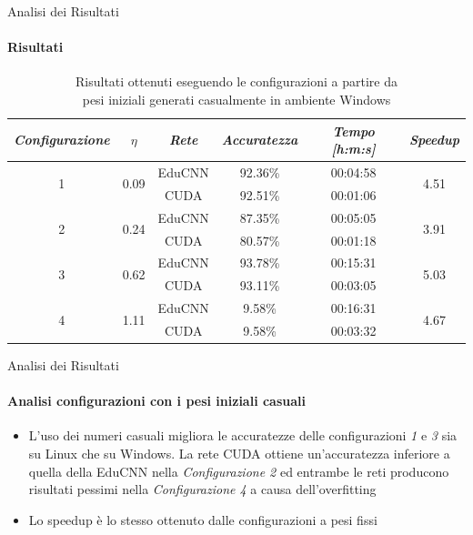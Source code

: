 \documentclass[
 ]{beamer}
\begin{document}
\begin{frame}{Analisi dei Risultati}
    \framesubtitle{Risultati}

           \begin{table}
            \centering
            \renewcommand\arraystretch{1.3}
            \small
            \begin{tabular}{| c | c | c | c | c | c |}
                \hline
                \emph{Configurazione} & $\eta$ & \emph{Rete} & \emph{Accuratezza} & \emph{Tempo [h:m:s]} & \emph{Speedup} \\
                \hline
                \multirow{2}{*}{1} & \multirow{2}{*}{0.09} & EduCNN & 92.36\% & 00:04:58 & \multirow{2}{*}{4.51} \\ \cline{3-5} 
                                   &                       & CUDA   & 92.51\% & 00:01:06 & \\
                \hline
                \multirow{2}{*}{2} & \multirow{2}{*}{0.24} & EduCNN & 87.35\% & 00:05:05 & \multirow{2}{*}{3.91} \\ \cline{3-5} 
                                   &                       & CUDA   & 80.57\% & 00:01:18  & \\
                \hline
                \multirow{2}{*}{3} & \multirow{2}{*}{0.62} & EduCNN & 93.78\% & 00:15:31 & \multirow{2}{*}{5.03} \\ \cline{3-5} 
                                   &                       & CUDA   & 93.11\% & 00:03:05 & \\
                \hline
                \multirow{2}{*}{4} & \multirow{2}{*}{1.11} & EduCNN & 9.58\% & 00:16:31 & \multirow{2}{*}{4.67} \\ \cline{3-5} 
                                   &                       & CUDA   & 9.58\% & 00:03:32  & \\
                \hline
            \end{tabular}
            \caption                        
    {Risultati ottenuti eseguendo le configurazioni a partire da \\ pesi iniziali generati casualmente in ambiente Windows \endtabular}          
        \end{table}    
\end{frame}

\begin{frame}{Analisi dei Risultati}
    \framesubtitle{Analisi configurazioni con i pesi iniziali casuali}
    \smallskip
    \begin{itemize} [<+->]
        \setlength\itemsep{2em}
        \item \large L'uso dei numeri casuali migliora le accuratezze delle configurazioni \emph{1} e \emph{3} sia su Linux che su Windows. La rete CUDA ottiene un'accuratezza inferiore a quella della EduCNN nella \emph{Configurazione 2} ed entrambe le reti producono risultati pessimi nella \emph{Configurazione 4} a causa dell'overfitting
        \item \large Lo speedup è lo stesso ottenuto dalle configurazioni a pesi fissi
    \end{itemize}     
\end{frame}
\end{document}
